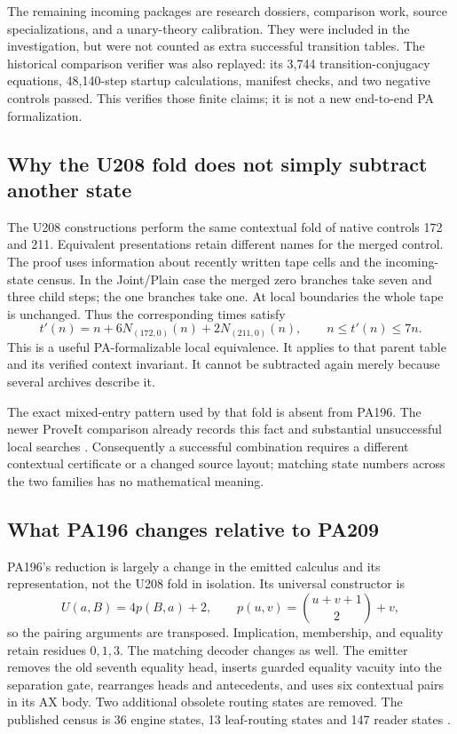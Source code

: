 \documentclass[11pt,letterpaper]{article}
\begin{document}
The remaining incoming packages are research dossiers, comparison work,
source specializations, and a unary-theory calibration. They were included
in the investigation, but were not counted as extra successful transition
tables. The historical comparison verifier was also replayed: its 3,744
transition-conjugacy equations, 48,140-step startup calculations, manifest
checks, and two negative controls passed. This verifies those finite
claims; it is not a new end-to-end PA formalization.

\subsection{Why the U208 fold does not simply subtract another state}

The U208 constructions perform the same contextual fold of native controls
172 and 211. Equivalent presentations retain different names for the merged
control. The proof uses information about recently written tape cells and
the incoming-state census. In the Joint/Plain case the merged zero branches
take seven and three child steps; the one branches take one. At local
boundaries the whole tape is unchanged. Thus the corresponding times satisfy
\[
 t'(n)=n+6N_{(172,0)}(n)+2N_{(211,0)}(n),\qquad n\le t'(n)\le7n.
\]
This is a useful PA-formalizable local equivalence. It applies to that
parent table and its verified context invariant. It cannot be subtracted
again merely because several archives describe it.

The exact mixed-entry pattern used by that fold is absent from PA196.
The newer ProveIt comparison already records this fact and substantial
unsuccessful local searches \cite{comparison}. Consequently a successful
combination requires a different contextual certificate or a changed source
layout; matching state numbers across the two families has no mathematical
meaning.

\subsection{What PA196 changes relative to PA209}

PA196's reduction is largely a change in the emitted calculus and its
representation, not the U208 fold in isolation. Its universal constructor is
\[
 U(a,B)=4p(B,a)+2,\qquad p(u,v)=\binom{u+v+1}{2}+v,
\]
so the pairing arguments are transposed. Implication, membership, and
equality retain residues $0,1,3$. The matching decoder changes as well.
The emitter removes the old seventh equality head, inserts guarded equality
vacuity into the separation gate, rearranges heads and antecedents, and
uses six contextual pairs in its AX body. Two additional obsolete routing
states are removed. The published census is 36 engine states, 13
leaf-routing states and 147 reader states \cite{pa196}.
\end{document}
